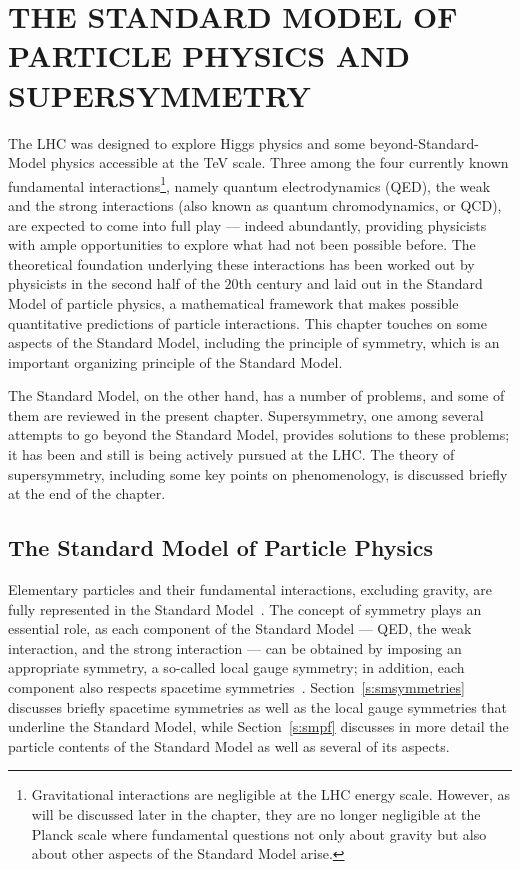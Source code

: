 
\chapter{THE STANDARD MODEL OF PARTICLE PHYSICS AND SUPERSYMMETRY}\label{c:sm}

The LHC was designed to explore Higgs physics and some beyond-Standard-Model
physics accessible at the TeV scale. Three among the four currently known
fundamental interactions\footnote{Gravitational interactions are negligible at
the LHC energy scale. However, as will be discussed later in the chapter, they
are no longer negligible at the Planck scale where fundamental questions not
only about gravity but also about other aspects of the Standard Model arise.},
namely quantum electrodynamics (QED), the weak and the strong interactions
(also known as quantum chromodynamics, or QCD), are expected to come into full
play --- indeed abundantly, providing physicists with ample opportunities to
explore what had not been possible before. The theoretical foundation
underlying these interactions has been worked out by physicists in the second
half of the $20$th century and laid out in the Standard Model of particle
physics, a mathematical framework that makes possible quantitative predictions
of particle interactions. This chapter touches on some aspects of the Standard
Model, including the principle of symmetry, which is an important organizing
principle of the Standard Model.

The Standard Model, on the other hand, has a number of problems, and some of
them are reviewed in the present chapter. Supersymmetry, one among several
attempts to go beyond the Standard Model, provides solutions to these problems;
it has been and still is being actively pursued at the LHC. The theory of
supersymmetry, including some key points on phenomenology, is discussed briefly
at the end of the chapter.


\section{The Standard Model of Particle Physics}

Elementary particles and their fundamental interactions, excluding gravity, are
fully represented in the Standard Model~\cite{smtheo01, smtheo02, smtheo03}.
The concept of symmetry plays an essential role, as each component of the
Standard Model --- QED, the weak interaction, and the strong interaction ---
can be obtained by imposing an appropriate symmetry, a so-called local gauge
symmetry; in addition, each component also respects spacetime
symmetries~\cite{smtheo04}. Section~\ref{s:smsymmetries} discusses briefly
spacetime symmetries as well as the local gauge symmetries that underline the
Standard Model, while Section~\ref{s:smpf} discusses in more detail the
particle contents of the Standard Model as well as several of its aspects.

